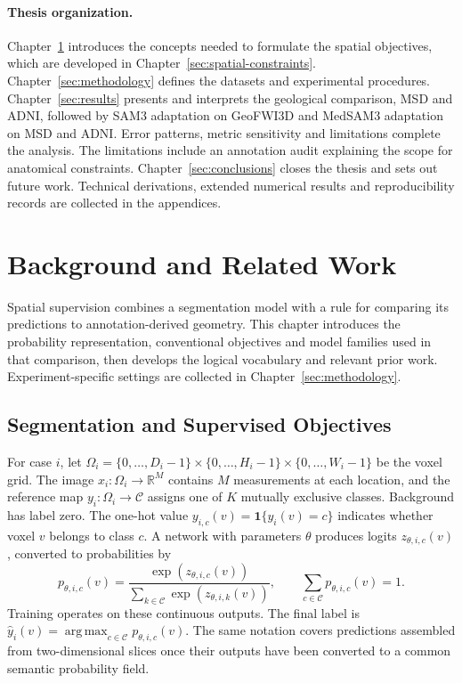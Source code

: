 \documentclass[12pt,a4paper]{article}
\begin{document}
\paragraph{Thesis organization.}\label{sec:organization}
Chapter~\ref{sec:background} introduces the concepts needed to formulate
the spatial objectives, which are developed in
Chapter~\ref{sec:spatial-constraints}. Chapter~\ref{sec:methodology}
defines the datasets and experimental procedures.
Chapter~\ref{sec:results} presents and interprets the geological comparison,
MSD and ADNI, followed by SAM3 adaptation on GeoFWI3D and MedSAM3
adaptation on MSD and ADNI. Error patterns, metric
sensitivity and limitations complete the analysis. The limitations include
an annotation audit explaining the scope for anatomical constraints.
Chapter~\ref{sec:conclusions} closes the thesis and sets out future work. Technical derivations, extended numerical results
and reproducibility records are collected in the appendices.

\clearpage
\section{Background and Related Work}\label{sec:background}

Spatial supervision combines a segmentation model with a rule for comparing
its predictions to annotation-derived geometry. This chapter introduces
the probability representation, conventional objectives and model families
used in that comparison, then develops the logical vocabulary and relevant
prior work. Experiment-specific settings are collected in
Chapter~\ref{sec:methodology}.

\subsection{Segmentation and Supervised Objectives}
\label{sec:volumetric-segmentation}\label{sec:segmentation-objectives}

For case $i$, let
$\Omega_i=\{0,\ldots,D_i-1\}\times\{0,\ldots,H_i-1\}\times
\{0,\ldots,W_i-1\}$ be the voxel grid. The image
$x_i:\Omega_i\to\mathbb R^M$ contains $M$ measurements at each location,
and the reference map $y_i:\Omega_i\to\mathcal C$ assigns one of $K$
mutually exclusive classes. Background has label zero. The one-hot value
$y_{i,c}(v)=\mathbf1\{y_i(v)=c\}$ indicates whether voxel $v$ belongs to
class $c$. A network with parameters $\theta$ produces logits
$z_{\theta,i,c}(v)$, converted to probabilities by
\begin{equation}
p_{\theta,i,c}(v)=
\frac{\exp(z_{\theta,i,c}(v))}
{\sum_{k\in\mathcal{C}}\exp(z_{\theta,i,k}(v))},
\qquad
\sum_{c\in\mathcal{C}}p_{\theta,i,c}(v)=1.
\label{eq:segmentation-softmax}
\end{equation}
Training operates on these continuous outputs. The final label is
$\widehat y_i(v)=\operatorname{arg\,max}_{c\in\mathcal C}
p_{\theta,i,c}(v)$. The same notation covers predictions assembled from
two-dimensional slices once their outputs have been converted to a common
semantic probability field.
\end{document}
